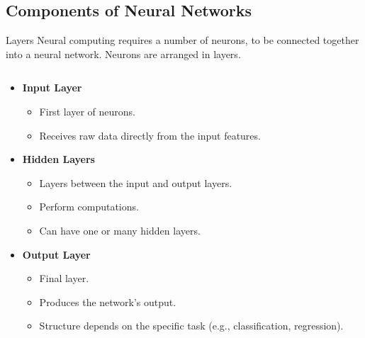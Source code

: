 \documentclass[10pt, hyperref={colorlinks = true,linkcolor = blue}]{beamer}
\begin{document}
{{{\subsection{Components of Neural Networks}
\begin{frame}{Layers}
Neural computing requires a
number of neurons, to be
connected together into a
neural network. Neurons are arranged in
layers. 
    \begin{columns}
        \begin{column}{0.6\textwidth}
 \begin{itemize}[<+->]
                \item \textbf{Input Layer}
                \begin{itemize}
                    \item First layer of neurons.
                    \item Receives raw data directly from the input features.
                \end{itemize}
                \item \textbf{Hidden Layers}
                \begin{itemize}
                    \item Layers between the input and output layers.
                    \item Perform computations.
                    \item Can have one or many hidden layers.
                \end{itemize}
                \item \textbf{Output Layer}
                \begin{itemize}
                    \item Final layer.
                    \item Produces the network's output.
                    \item Structure depends on the specific task (e.g., classification, regression).
                \end{itemize}
            \end{itemize}
        \end{column}
        

\end{columns}
\end{frame}}}}
\end{document}
